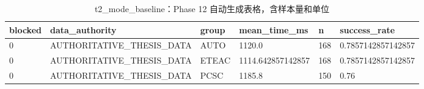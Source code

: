 \begin{table}[htbp]
\centering
\caption{t2_mode_baseline：Phase 12 自动生成表格，含样本量和单位}
\begin{tabular}{llllll}
\hline
blocked & data_authority & group & mean_time_ms & n & success_rate \\
\hline
0 & AUTHORITATIVE\_THESIS\_DATA & AUTO & 1120.0 & 168 & 0.7857142857142857 \\
0 & AUTHORITATIVE\_THESIS\_DATA & ETEAC & 1114.642857142857 & 168 & 0.7857142857142857 \\
0 & AUTHORITATIVE\_THESIS\_DATA & PCSC & 1185.8 & 150 & 0.76 \\
\hline
\end{tabular}
\end{table}
